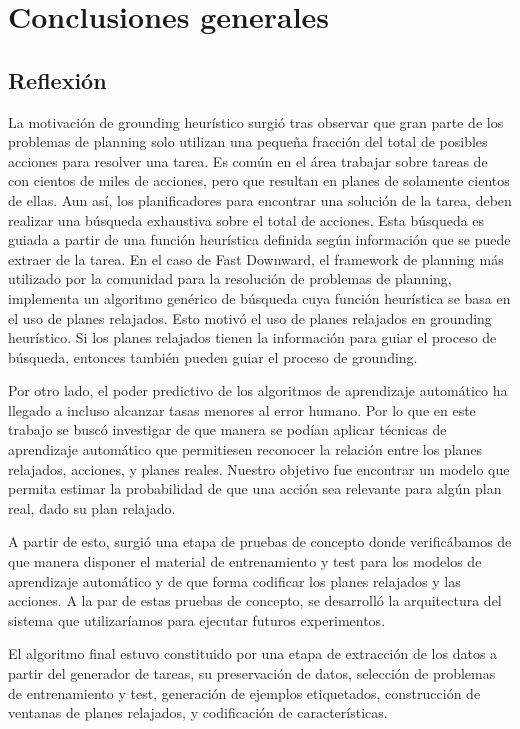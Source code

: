 \chapter{Conclusiones generales}
\label{ch:con}

\section{Reflexión}

La motivación de grounding heurístico surgió tras observar que gran parte de los
problemas de planning solo utilizan una pequeña fracción del total de posibles
acciones para resolver una tarea. Es común en el área trabajar sobre tareas de
con cientos de miles de acciones, pero que resultan en planes de solamente
cientos de ellas. Aun así, los planificadores para encontrar una solución de la
tarea, deben realizar una búsqueda exhaustiva sobre el total de acciones. Esta
búsqueda es guiada a partir de una función heurística definida según
información que se puede extraer de la tarea. En el caso de Fast Downward, el
framework de planning más utilizado por la comunidad para la resolución de
problemas de planning, implementa un algoritmo genérico de búsqueda cuya función
heurística se basa en el uso de planes relajados. Esto motivó el uso de planes
relajados en grounding heurístico. Si los planes relajados tienen la información
para guiar el proceso de búsqueda, entonces también pueden guiar el proceso de
grounding.

Por otro lado, el poder predictivo de los algoritmos de aprendizaje automático
ha llegado a incluso alcanzar tasas menores al error humano. Por lo que en este
trabajo se buscó investigar de que manera se podían aplicar técnicas de
aprendizaje automático que permitiesen reconocer la relación entre los planes
relajados, acciones, y planes reales. Nuestro objetivo fue encontrar un modelo
que permita estimar la probabilidad de que una acción sea relevante para algún
plan real, dado su plan relajado.

A partir de esto, surgió una etapa de pruebas de concepto donde verificábamos de
que manera disponer el material de entrenamiento y test para los modelos de
aprendizaje automático y de que forma codificar los planes relajados y las
acciones. A la par de estas pruebas de concepto, se desarrolló la arquitectura
del sistema que utilizaríamos para ejecutar futuros experimentos.

El algoritmo final estuvo constituido por una etapa de extracción de los datos a
partir del generador de tareas, su preservación de datos, selección de problemas
de entrenamiento y test, generación de ejemplos etiquetados, construcción de
ventanas de planes relajados, y codificación de características.

